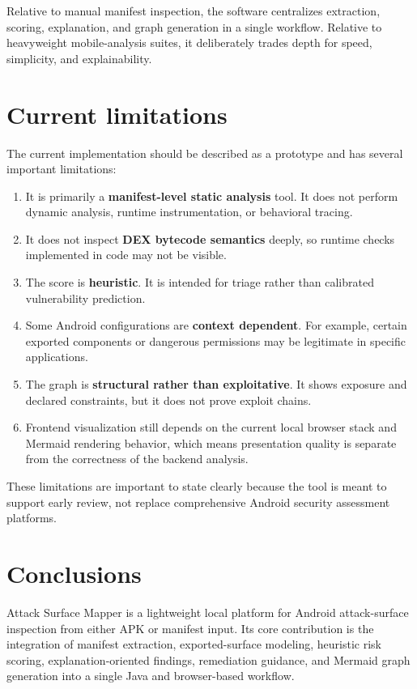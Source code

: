 \documentclass[preprint,12pt,a4paper]{elsarticle}
\begin{document}
Relative to manual manifest inspection, the software centralizes extraction, scoring, explanation, and graph generation in a single workflow. Relative to heavyweight mobile-analysis suites, it deliberately trades depth for speed, simplicity, and explainability.

\section{Current limitations}

The current implementation should be described as a prototype and has several important limitations:

\begin{enumerate}[leftmargin=*]
\item It is primarily a \textbf{manifest-level static analysis} tool. It does not perform dynamic analysis, runtime instrumentation, or behavioral tracing.
\item It does not inspect \textbf{DEX bytecode semantics} deeply, so runtime checks implemented in code may not be visible.
\item The score is \textbf{heuristic}. It is intended for triage rather than calibrated vulnerability prediction.
\item Some Android configurations are \textbf{context dependent}. For example, certain exported components or dangerous permissions may be legitimate in specific applications.
\item The graph is \textbf{structural rather than exploitative}. It shows exposure and declared constraints, but it does not prove exploit chains.
\item Frontend visualization still depends on the current local browser stack and Mermaid rendering behavior, which means presentation quality is separate from the correctness of the backend analysis.
\end{enumerate}

These limitations are important to state clearly because the tool is meant to support early review, not replace comprehensive Android security assessment platforms.

\section{Conclusions}

Attack Surface Mapper is a lightweight local platform for Android attack-surface inspection from either APK or manifest input. Its core contribution is the integration of manifest extraction, exported-surface modeling, heuristic risk scoring, explanation-oriented findings, remediation guidance, and Mermaid graph generation into a single Java and browser-based workflow.
\end{document}
